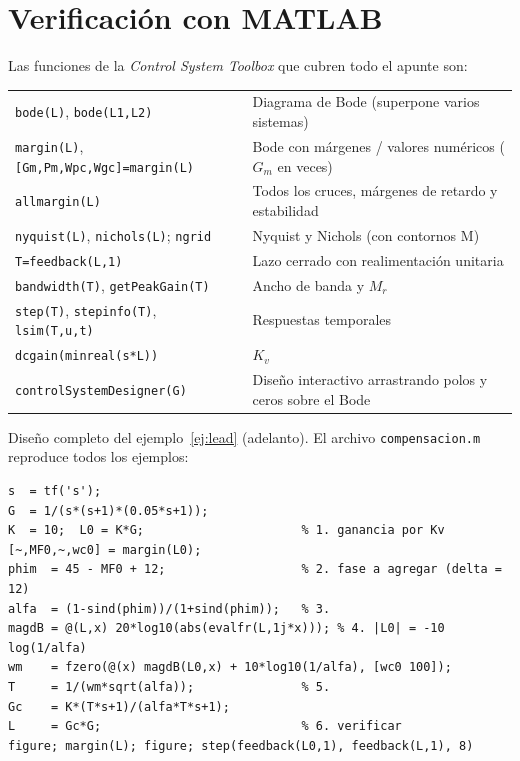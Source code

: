 \documentclass[11pt,a4paper]{article}
\newcounter{ejemplo}
\begin{document}
\section{Verificación con MATLAB}
\label{ap:matlab}
Las funciones de la \emph{Control System Toolbox} que cubren todo el apunte son:
\begin{center}
\small
\begin{tabular}{@{}ll@{}}
\toprule
\texttt{bode(L)}, \texttt{bode(L1,L2)} & Diagrama de Bode (superpone varios sistemas)\\
\texttt{margin(L)}, \texttt{[Gm,Pm,Wpc,Wgc]=margin(L)} & Bode con márgenes / valores numéricos ($G_m$ en veces)\\
\texttt{allmargin(L)} & Todos los cruces, márgenes de retardo y estabilidad\\
\texttt{nyquist(L)}, \texttt{nichols(L)}; \texttt{ngrid} & Nyquist y Nichols (con contornos M)\\
\texttt{T=feedback(L,1)} & Lazo cerrado con realimentación unitaria\\
\texttt{bandwidth(T)}, \texttt{getPeakGain(T)} & Ancho de banda y $M_r$\\
\texttt{step(T)}, \texttt{stepinfo(T)}, \texttt{lsim(T,u,t)} & Respuestas temporales\\
\texttt{dcgain(minreal(s*L))} & $K_v$\\
\texttt{controlSystemDesigner(G)} & Diseño interactivo arrastrando polos y ceros sobre el Bode\\
\bottomrule
\end{tabular}
\end{center}

Diseño completo del ejemplo~\ref{ej:lead} (adelanto). El archivo \texttt{compensacion.m} reproduce todos los ejemplos:
\begin{tcolorbox}[base,colback=gris!4,colframe=gris,boxrule=0.4pt]
\small
\begin{verbatim}
s  = tf('s');
G  = 1/(s*(s+1)*(0.05*s+1));
K  = 10;  L0 = K*G;                      % 1. ganancia por Kv
[~,MF0,~,wc0] = margin(L0);
phim  = 45 - MF0 + 12;                   % 2. fase a agregar (delta = 12)
alfa  = (1-sind(phim))/(1+sind(phim));   % 3.
magdB = @(L,x) 20*log10(abs(evalfr(L,1j*x))); % 4. |L0| = -10 log(1/alfa)
wm    = fzero(@(x) magdB(L0,x) + 10*log10(1/alfa), [wc0 100]);
T     = 1/(wm*sqrt(alfa));               % 5.
Gc    = K*(T*s+1)/(alfa*T*s+1);
L     = Gc*G;                            % 6. verificar
figure; margin(L); figure; step(feedback(L0,1), feedback(L,1), 8)
\end{verbatim}
\end{tcolorbox}
\end{document}
